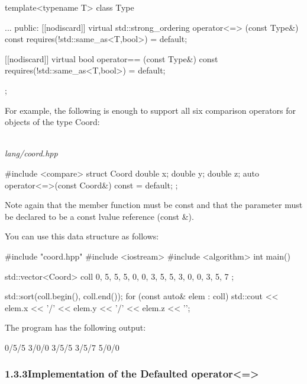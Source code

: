 \begin{cpp}
template<typename T>
class Type {
	...
	public:
	[[nodiscard]] virtual std::strong_ordering
		operator<=> (const Type&) const requires(!std::same_as<T,bool>) = default;
	
	[[nodiscard]] virtual bool
		operator== (const Type&) const requires(!std::same_as<T,bool>) = default;
};
\end{cpp}

For example, the following is enough to support all six comparison operators for objects of the type Coord:

\noindent
\hspace*{\fill} \\ %
\textit{lang/coord.hpp}

\begin{cpp}
#include <compare>
struct Coord {
	double x{};
	double y{};
	double z{};
	auto operator<=>(const Coord&) const = default;
};
\end{cpp}

Note again that the member function must be const and that the parameter must be declared to be a const lvalue reference (const \&).

You can use this data structure as follows:


\begin{cpp}
#include "coord.hpp"
#include <iostream>
#include <algorithm>
int main()
{
	std::vector<Coord> coll{ {0, 5, 5}, {5, 0, 0}, {3, 5, 5},
							 {3, 0, 0}, {3, 5, 7} };
							 
	std::sort(coll.begin(), coll.end());
	for (const auto& elem : coll) {
		std::cout << elem.x << '/' << elem.y << '/' << elem.z << '\n';
	}
}
\end{cpp}

The program has the following output:

\begin{shell}
0/5/5
3/0/0
3/5/5
3/5/7
5/0/0
\end{shell}

\subsubsection*{ 1.3.3\hspace{0.2cm}Implementation of the Defaulted operator<=>}

